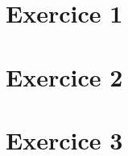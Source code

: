 \documentclass{article}
\begin{document}
	\maketitle
	\section{Exercice 1}
	
	
	\section{Exercice 2}
	
	
	\section{Exercice 3}
	
	\newpage
	
\end{document}
